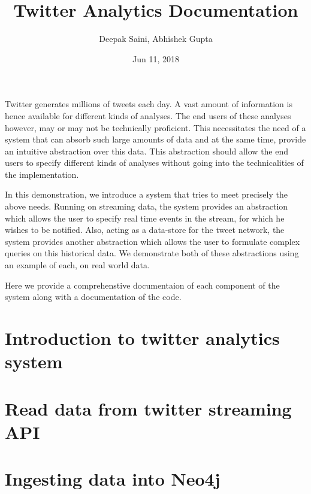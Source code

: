 \documentclass[letterpaper,10pt,english]{sphinxmanual}
\title{Twitter Analytics Documentation}
\date{Jun 11, 2018}
\author{Deepak Saini, Abhishek Gupta}
\begin{document}
\maketitle
\sphinxtableofcontents
{}\label{\detokenize{index::doc}}


Twitter generates millions of tweets each day. A vast amount of information is hence available for different kinds of analyses. The end users of these analyses however, may or may not be technically proficient. This necessitates the need of a system that can absorb such large amounts of data and at the same time, provide an intuitive abstraction over this data. This abstraction should allow the end users to specify different kinds of analyses without going into the technicalities of the implementation.

In this demonstration, we introduce a system that tries to meet precisely the above needs. Running on streaming data, the system provides an abstraction which allows the user to specify real time events in the stream, for which he wishes to be notified. Also, acting as a data-store for the tweet network, the system provides another abstraction which allows the user to formulate complex queries on this historical data. We demonstrate both of these abstractions using an example of each, on real world data.

Here we provide a comprehenstive documentaion of each component of the system along with a documentation of the code.


\chapter{Introduction to twitter analytics system}
\label{\detokenize{introduction:introduction-to-twitter-analytics-system}}\label{\detokenize{introduction::doc}}

\chapter{Read data from twitter streaming API}
\label{\detokenize{twitter_stream:read-data-from-twitter-streaming-api}}\label{\detokenize{twitter_stream::doc}}

\chapter{Ingesting data into Neo4j}
\label{\detokenize{neo4j_data_ingestion:ingesting-data-into-neo4j}}\label{\detokenize{neo4j_data_ingestion::doc}}
\end{document}
